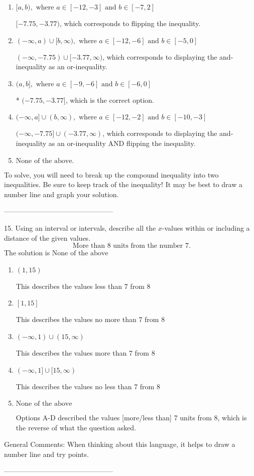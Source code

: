 \documentclass{article}[14pt]
\begin{document}
\begin{enumerate}[label=\Alph*.] 
\item $ [a, b), \text{ where } a \in [-12, -3] \text{ and } b \in [-7, 2] $ 

 $[-7.75, -3.77)$, which corresponds to flipping the inequality. 
\item $ (-\infty, a) \cup [b, \infty), \text{ where } a \in [-12, -6] \text{ and } b \in [-5, 0] $ 

 $(-\infty, -7.75) \cup [-3.77, \infty)$, which corresponds to displaying the and-inequality as an or-inequality. 
\item $ (a, b], \text{ where } a \in [-9, -6] \text{ and } b \in [-6, 0] $ 

 * $(-7.75, -3.77]$, which is the correct option. 
\item $ (-\infty, a] \cup (b, \infty), \text{ where } a \in [-12, -2] \text{ and } b \in [-10, -3] $ 

 $(-\infty, -7.75] \cup (-3.77, \infty)$, which corresponds to displaying the and-inequality as an or-inequality AND flipping the inequality. 
\item $ \text{None of the above.} $ 

  
\end{enumerate} 
 
To solve, you will need to break up the compound inequality into two inequalities. Be sure to keep track of the inequality! It may be best to draw a number line and graph your solution.

-----------------------------------------------

15. Using an interval or intervals, describe all the $x$-values within or including a distance of the given values.
$$ \text{ More than } 8 \text{ units from the number } 7. $$ 
The solution is $ \text{None of the above} $ 

\begin{enumerate}[label=\Alph*.] 
\item $ (1, 15) $ 

 This describes the values less than 7 from 8 
\item $ [1, 15] $ 

 This describes the values no more than 7 from 8 
\item $ (-\infty, 1) \cup (15, \infty) $ 

 This describes the values more than 7 from 8 
\item $ (-\infty, 1] \cup [15, \infty) $ 

 This describes the values no less than 7 from 8 
\item $ \text{None of the above} $ 

 Options A-D described the values [more/less than] 7 units from 8, which is the reverse of what the question asked. 
\end{enumerate} 
 
General Comments: When thinking about this language, it helps to draw a number line and try points.

-----------------------------------------------
\end{document}
